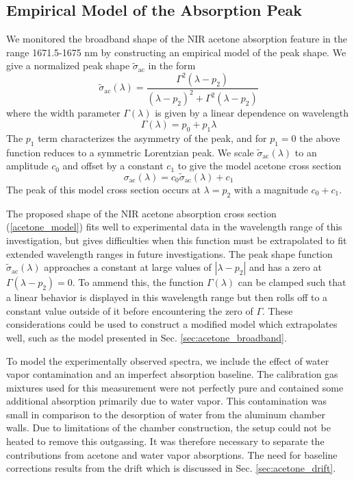 \documentclass[8pt,a4paper]{report}
\begin{document}
	\subsection{Empirical Model of the Absorption Peak}
	We monitored the broadband shape of the NIR acetone absorption feature in the range 1671.5-1675 nm by constructing an empirical model of the peak shape. We give a normalized peak shape $\tilde{\sigma}_{\mathrm{ac}}$ in the form
	\begin{equation} \label{sigma_tilde}
		\tilde{\sigma}_{\mathrm{ac}}(\lambda) = \frac{\Gamma^2(\lambda-p_2)}{(\lambda-p_2)^2 + \Gamma^2(\lambda-p_2)}
	\end{equation}
	where the width parameter $\Gamma(\lambda)$ is given by a linear dependence on wavelength
	\begin{equation}\label{Lambda}
		\Gamma(\lambda) = p_0 + p_1 \lambda
	\end{equation}
	The $p_1$ term characterizes the asymmetry of the peak, and for $p_1=0$ the above function reduces to a symmetric Lorentzian peak. We scale $\tilde{\sigma}_{\mathrm{ac}}(\lambda)$ to an amplitude $c_0$ and offset by a constant $c_1$ to give the model acetone cross section
	\begin{equation} \label{acetone_model}
		\sigma_\mathrm{ac}(\lambda) = c_0\tilde{\sigma}_{\mathrm{ac}}(\lambda) + c_1
	\end{equation}
	The peak of this model cross section occurs at $\lambda=p_2$ with a magnitude $c_0 + c_1$.
	
	The proposed shape of the NIR acetone absorption cross section (\ref{acetone_model}) fits well to experimental data in the wavelength range of this investigation, but gives difficulties when this function must be extrapolated to fit extended wavelength ranges in future investigations. The peak shape function $\tilde{\sigma}_{\mathrm{ac}}(\lambda)$ approaches a constant at large values of $\left|\lambda-p_2\right|$ and has a zero at $\Gamma(\lambda-p_2)=0$. To ammend this, the function $\Gamma(\lambda)$ can be clamped such that a linear behavior is displayed in this wavelength range but then rolls off to a constant value outside of it before encountering the zero of $\Gamma$. These considerations could be used to construct a modified model which extrapolates well, such as the model presented in Sec. \ref{sec:acetone_broadband}.
	
	To model the experimentally observed spectra, we include the effect of water vapor contamination and an imperfect absorption baseline. The calibration gas mixtures used for this measurement were not perfectly pure and contained some additional absorption primarily due to water vapor. This contamination was small in comparison to the desorption of water from the aluminum chamber walls. Due to limitations of the chamber construction, the setup could not be heated to remove this outgassing. It was therefore necessary to separate the contributions from acetone and water vapor absorptions. The need for baseline corrections results from the drift which is discussed in Sec. \ref{sec:acetone_drift}.
	
\end{document}
